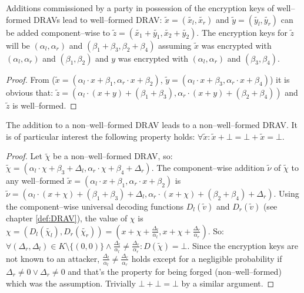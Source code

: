 \begin{lem}
  \label{lem:DRAV-add}

Additions commissioned by a party in possession of the encryption keys of
well--formed DRAVs lead to well--formed DRAV: $\widetilde{x} =
(\widetilde{x_l}, \widetilde{x_r})$ and $\widetilde{y} = (\widetilde{y_l},
\widetilde{y_r})$ can be added component--wise to $\widetilde{z} =
\left(\widetilde{x_1} + \widetilde{y_1}, \widetilde{x_2} +
\widetilde{y_2}\right)$. The encryption keys for $\widetilde{z}$ will be
$(\alpha_l, \alpha_r)$ and $(\beta_1 + \beta_3, \beta_2 + \beta_4)$ assuming
$\widetilde{x}$ was encrypted with $(\alpha_l, \alpha_r)$ and $(\beta_1,
\beta_2)$ and $y$ was encrypted with $(\alpha_l, \alpha_r)$ and $(\beta_3,
\beta_4)$.

\end{lem}
\begin{proof}

From ($\widetilde{x} = \left(\alpha_l \cdot x + \beta_1,
\alpha_r \cdot x + \beta_2\right)$, $\widetilde{y} = \left(\alpha_l \cdot x +
\beta_3, \alpha_r \cdot x + \beta_4\right)$) it is obvious that: $\widetilde{z}
= \left(\alpha_l \cdot (x+y) + (\beta_1 + \beta_3), \alpha_r \cdot (x+y) +
(\beta_2 + \beta_4)\right)$ and $\widetilde{z}$ is well--formed.

\end{proof}

\begin{lem}
  \label{lem:DRAV-add-bad}

The addition to a non--well--formed DRAV leads to a non--well--formed DRAV\@. It
is of particular interest the following property holds: $\forall \widetilde{x}:
\widetilde{x} + \bot = \bot + \widetilde{x} = \bot$.

\end{lem}
\begin{proof}

Let $\widetilde{\chi}$ be a non--well--formed DRAV, so: $\widetilde{\chi} =
(\alpha_l \cdot \chi + \beta_3 + \Delta_l, \alpha_r \cdot \chi + \beta_4 +
\Delta_r)$. The component--wise addition $\widetilde{\nu}$ of $\widetilde{\chi}$
to any well--formed $\widetilde{x} = (\alpha_l \cdot x + \beta_1, \alpha_r \cdot
x + \beta_2)$ is $\widetilde{\nu} = (\alpha_l \cdot (x+\chi) + (\beta_1+\beta_3)
+ \Delta_l, \alpha_r \cdot (x+\chi) + (\beta_2+\beta_4) + \Delta_r)$.  Using the
component--wise universal decoding functions $D_l(\widetilde{v})$ and
$D_r(\widetilde{v})$ (see chapter \ref{def:DRAV}), the value of $\chi$ is $\chi
= (D_l(\widetilde{\chi_l}), D_r(\widetilde{\chi_r})) = (x + \chi +
\frac{\Delta_l}{\alpha_l}, x + \chi + \frac{\Delta_r}{\alpha_r})$. So: $\forall
(\Delta_r, \Delta_l) \in K \setminus \{(0, 0)\} \wedge \frac{\Delta_l}{\alpha_l}
\neq \frac{\Delta_r}{\alpha_r}: D(\widetilde{\chi}) = \bot$. Since the
encryption keys are not known to an attacker, $\frac{\Delta_l}{\alpha_l} \neq
\frac{\Delta_r}{\alpha_r}$ holds except for a negligible probability if
$\Delta_r \neq 0 \vee \Delta_r \neq 0$ and that's the property for being forged
(non--well--formed) which was the assumption. Trivially $\bot + \bot = \bot$ by
a similar argument.

\end{proof}


